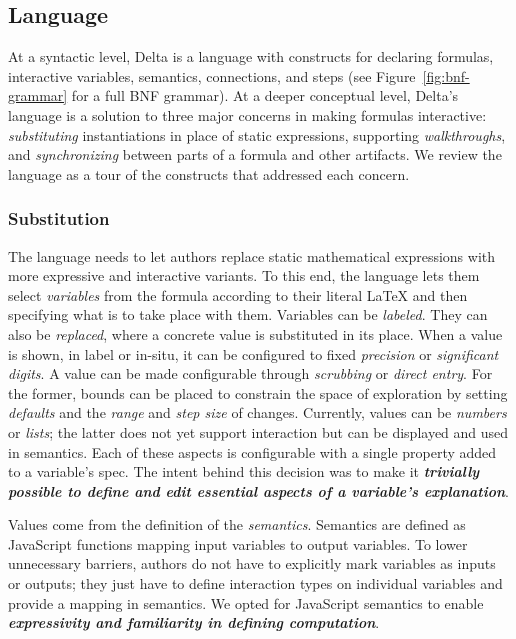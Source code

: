 \subsection{Language}\label{Language}

At a syntactic level, Delta is a language with constructs for declaring formulas, interactive variables, semantics, connections, and steps (see Figure~\ref{fig:bnf-grammar} for a full BNF grammar). At a deeper conceptual level, Delta's language is a solution to three major concerns in making formulas interactive: \emph{substituting} instantiations in place of static expressions, supporting \emph{walkthroughs}, and \emph{synchronizing} between parts of a formula and other artifacts. We review the language as a tour of the constructs that addressed each concern.

\subsubsection{Substitution}
The language needs to let authors replace static mathematical expressions with more expressive and interactive variants. To this end, the language lets them select \textit{variables} from the formula according to their literal LaTeX and then specifying what is to take place with them. Variables can be \emph{labeled}. They can also be \emph{replaced}, where a concrete value is substituted in its place. When a value is shown, in label or in-situ, it can be configured to fixed \emph{precision} or \emph{significant digits}. A value can be made configurable through \emph{scrubbing} or \emph{direct entry}. For the former, bounds can be placed to constrain the space of exploration by setting \emph{defaults} and the \emph{range} and \emph{step size} of changes. Currently, values can be \emph{numbers} or \emph{lists}; the latter does not yet support interaction but can be displayed and used in semantics. Each of these aspects is configurable with a single property added to a variable's spec. The intent behind this decision was to make it \textbf{\textit{trivially possible to define and edit essential aspects of a variable's explanation}}.

Values come from the definition of the \emph{semantics}. Semantics are defined as JavaScript functions mapping input variables to output variables. To lower unnecessary barriers, authors do not have to explicitly mark variables as inputs or outputs; they just have to define interaction types on individual variables and provide a mapping in semantics. We opted for JavaScript semantics to enable \textbf{\textit{expressivity and familiarity in defining computation}}.

